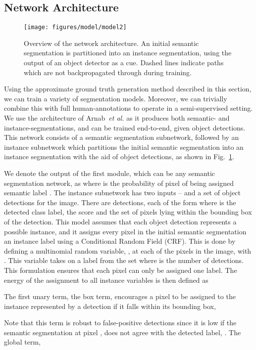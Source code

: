\documentclass[runningheads]{llncs}
\def\etal{\emph{et al.} }
\begin{document}
\subsection{Network Architecture}
\label{sec:model}
\begin{figure}[t]
\centering
\texttt{[image: figures/model/model2]}
\caption{Overview of the network architecture. An initial semantic segmentation is partitioned into an instance segmentation, using the output of an object detector as a cue. Dashed lines indicate paths which are not backpropagated through during training.}
\label{fig:model}
\end{figure} Using the approximate ground truth generation method described in this section, we can train a variety of segmentation models.
Moreover, we can trivially combine this with full human-annotations to operate in a semi-supervised setting.
We use the architecture of Arnab~\etal\cite{arnab_cvpr_2017} as it produces both semantic- and instance-segmentations, and can be trained end-to-end, given object detections.
This network consists of a semantic segmentation subnetwork, followed by an instance subnetwork which partitions the initial semantic segmentation into an instance segmentation with the aid of object detections, as shown in Fig.~\ref{fig:model}.

We denote the output of the first module, which can be any semantic segmentation network, as  where  is the probability of pixel  of being assigned semantic label .
The instance subnetwork has two inputs --  and a set of object detections for the image.
There are  detections, each of the form  where  is the detected class label,  the score and  the set of pixels lying within the bounding box of the  detection.
This model assumes that each object detection represents a possible instance, and it assigns every pixel in the initial semantic segmentation an instance label using a Conditional Random Field (CRF).
This is done by defining a multinomial random variable, , at each of the  pixels in the image, with .
This variable takes on a label from the set  where  is the number of detections.
This formulation ensures that each pixel can only be assigned one label.
The energy of the assignment  to all instance variables  is then defined as

The first unary term, the box term, encourages a pixel to be assigned to the instance represented by a detection if it falls within its bounding box,

Note that this term is robust to false-positive detections \cite{arnab_cvpr_2017} since it is low if the semantic segmentation at pixel ,  does not agree with the detected label, . The global term,
\end{document}
